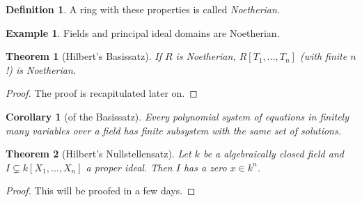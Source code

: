 \documentclass[DIV=14,parskip=half]{scrartcl}
\newtheorem{thm}{Theorem}[subsection]
\newtheorem{cor}{Corollary}[subsection]
\theoremstyle{definition}
\newtheorem{defi}{Definition}[subsection]
\newtheorem*{example}{Example}%
\begin{document}
\begin{defi}\label{def:Noetherian}
 A ring with these properties is called \emph{Noetherian}.
\end{defi}
\begin{example}
 Fields and principal ideal domains are Noetherian. 
\end{example}
\begin{thm}[Hilbert's Basissatz]\label{thm:Basissatz}
 If $R$ is Noetherian, $R[T_1,\dots,T_n]$ (with finite $n$!) is Noetherian.
\end{thm}
\begin{proof}
 The proof is recapitulated later on.
\end{proof}
\begin{cor}[of the Basissatz]
 Every polynomial system of equations in finitely many variables over a field has finite subsystem with the same set of solutions.
\end{cor}
\begin{thm}[Hilbert's Nullstellensatz] \label{thm:Nullstellensatz}
 Let $k$ be a algebraically closed field and $I\subsetneq k[X_1,\dots,X_n]$ a proper ideal. Then $I$ has a zero $x\in k^n$.
\end{thm}
\begin{proof}
 This will be proofed in a few days.
\end{proof}
\end{document}
